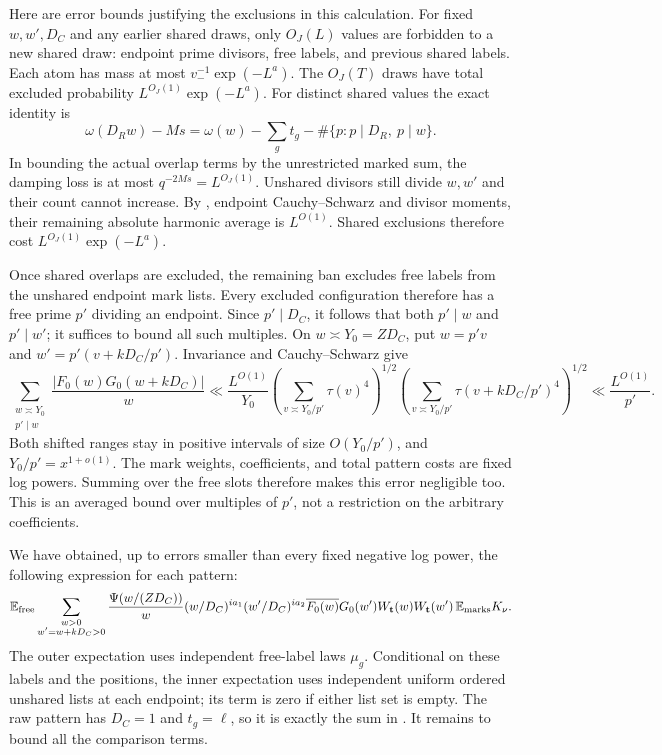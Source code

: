 Here are error bounds justifying the exclusions in this calculation.
For fixed $w,w',D_C$ and any earlier shared draws, only $O_J(L)$
values are forbidden to a new shared draw: endpoint prime divisors,
free labels, and previous shared labels. Each atom has mass at most
$v_-^{-1}\exp(-L^a)$. The $O_J(T)$ draws have total excluded
probability $L^{O_J(1)}\exp(-L^a)$. For distinct shared values the exact
identity is
\[
 \omega(D_Rw)-Ms=\omega(w)-\sum_g t_g
             -\#\{p:p\mid D_R,\ p\mid w\}.
\]
In bounding the actual overlap terms by the unrestricted marked sum,
the damping loss is at most $q^{-2Ms}=L^{O_J(1)}$. Unshared divisors
still divide $w,w'$ and their count cannot increase. By
, endpoint Cauchy--Schwarz and divisor moments, their
remaining absolute harmonic average is $L^{O(1)}$. Shared exclusions
therefore cost $L^{O_J(1)}\exp(-L^a)$.

Once shared overlaps are excluded, the remaining ban excludes free
labels from the unshared endpoint mark lists. Every excluded
configuration therefore has a free prime $p'$ dividing an endpoint.
Since $p'\mid D_C$, it follows that both $p'\mid w$ and $p'\mid w'$;
it suffices to bound all such multiples. On $w\asymp Y_0=ZD_C$, put $w=p'v$ and
$w'=p'(v+kD_C/p')$. Invariance and Cauchy--Schwarz give
\[
 \sum_{\substack{w\asymp Y_0\\p'\mid w}}
 \frac{|F_0(w)G_0(w+kD_C)|}{w}
 \ll \frac{L^{O(1)}}{Y_0}
 \left(\sum_{v\asymp Y_0/p'}\tau(v)^4\right)^{1/2}
 \left(\sum_{v\asymp Y_0/p'}
            \tau(v+kD_C/p')^4\right)^{1/2}
 \ll\frac{L^{O(1)}}{p'}.
\]
Both shifted ranges stay in positive intervals of size $O(Y_0/p')$,
and $Y_0/p'=x^{1+o(1)}$. The mark weights, coefficients, and total
pattern costs are fixed log powers. Summing over the free slots
therefore makes this error negligible too. This is an averaged bound
over multiples of $p'$, not a restriction on the arbitrary coefficients.

We have obtained, up to errors smaller than every fixed negative log
power, the following expression for each pattern:
\begin{equation}\label{eq:stripped-pattern}
 \mathbb E_{\rm free}\sum_{\substack{w>0\\w'=w+kD_C>0}}
 \frac{\Psi(w/(ZD_C))}{w}
 (w/D_C)^{ia_1}(w'/D_C)^{ia_2}
 \overline{F_0(w)}G_0(w')
 W_{\mathbf t}(w)W_{\mathbf t}(w')\,
 \mathbb E_{\rm marks}K_\nu.
\end{equation}
The outer expectation uses independent free-label laws $\mu_g$.
Conditional on these labels and the positions, the inner expectation
uses independent uniform ordered unshared lists at each endpoint;
its term is zero if either list set is empty. The raw pattern has
$D_C=1$ and $t_g=\ell$, so it is exactly the sum in
. It remains to bound all the comparison terms.

